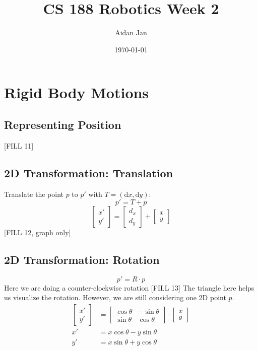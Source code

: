 \documentclass[10pt]{article}
\title{CS 188 Robotics Week 2}
\author{Aidan Jan}
\date{\today}
\newcommand{\dd}{\text{d}}
\begin{document}
\maketitle 

\section*{Rigid Body Motions}

\subsection*{Representing Position}
[FILL 11]

\subsection*{2D Transformation: Translation}
Translate the point $p$ to $p'$ with $T = (\dd x, \dd y)$:
\[p' = T + p\]
\[\begin{bmatrix} x' \\ y' \end{bmatrix} = \begin{bmatrix} d_x \\ d_y \end{bmatrix} + \begin{bmatrix} x \\ y \end{bmatrix}\]
[FILL 12, graph only]

\subsection*{2D Transformation: Rotation}
\[p' = R \cdot p\]
Here we are doing a counter-clockwise rotation
[FILL 13]
The triangle here helps us visualize the rotation.  However, we are still considering one 2D point $p$.
\begin{align*}
    \begin{bmatrix} x' \\ y' \end{bmatrix} &= \begin{bmatrix} \cos \theta & -\sin \theta \\ \sin \theta & \cos \theta \end{bmatrix} \cdot \begin{bmatrix} x \\ y \end{bmatrix}\\
    x' &= x \cos \theta - y \sin \theta\\
    y' &= x \sin \theta + y \cos \theta
\end{align*}
\end{document}
